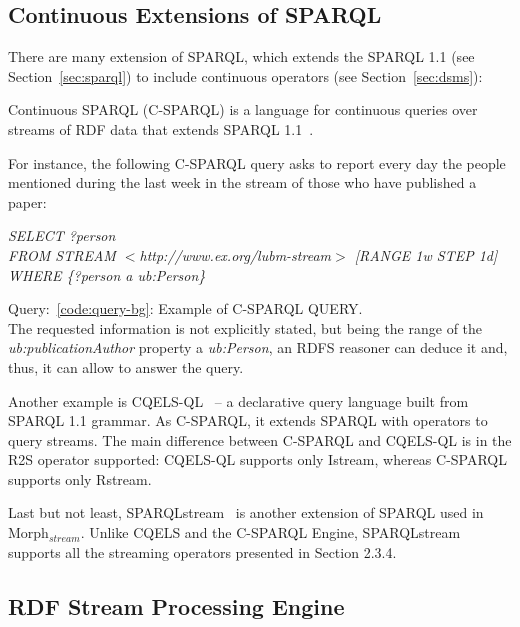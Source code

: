 \subsection{Continuous Extensions of SPARQL}\label{sec:continuous-sparql}

There are many extension of SPARQL, which extends the SPARQL 1.1 (see Section~\ref{sec:sparql}) to include continuous operators (see Section~\ref{sec:dsms}):

Continuous SPARQL (C-SPARQL)  is a language for continuous queries over streams of RDF data that extends SPARQL 1.1~\cite{Barbieri:2010:QRS:1860702.1860705}.

For instance, the following C-SPARQL query asks to report every day the people mentioned during the last week in the stream of those who have published a paper:

\begin{center}
\raggedright
\textit{SELECT ?person}\\
\textit{FROM STREAM $<$http://www.ex.org/lubm-stream$>$ [RANGE 1w STEP 1d]}\\
\textit{WHERE \{?person a ub:Person\}}\\
\label{code:query-bg}
\end{center}
Query:~\ref{code:query-bg}: Example of C-SPARQL QUERY.\\

The requested information is not explicitly stated, but being the range of the \textit{ub:publicationAuthor} property a \textit{ub:Person}, an RDFS reasoner can deduce it and, thus, it can allow to answer the query.

Another example is CQELS-QL~\cite{Lephuoc2011} – a declarative query language built from SPARQL 1.1 grammar. As C-SPARQL, it extends SPARQL with operators to query streams. The main difference between C-SPARQL and CQELS-QL is in the R2S operator supported: CQELS-QL supports only Istream, whereas C-SPARQL supports only Rstream. 

Last but not least, SPARQLstream~\cite{Calbimonte:2010:EOA:1940281.1940289} is another extension of SPARQL used in Morph$_{stream}$. Unlike CQELS and the C-SPARQL Engine, SPARQLstream supports all the streaming operators presented in Section 2.3.4. 

\subsection{RDF Stream Processing Engine}\label{sec:rspengine}

